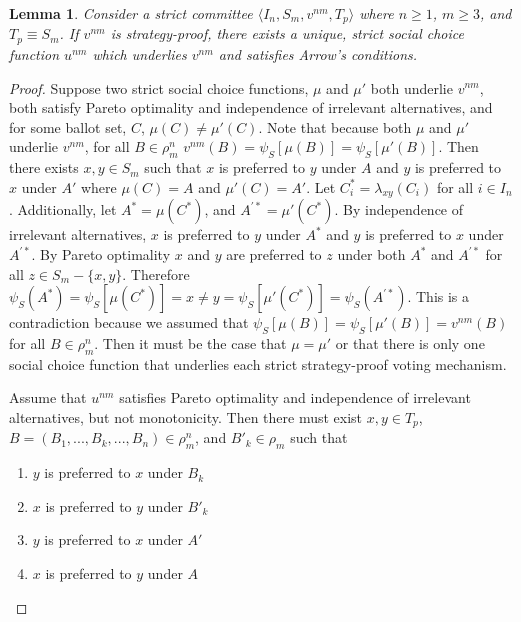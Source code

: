 \documentclass{amsart}
\newtheorem{lemma}{Lemma}
\theoremstyle{plain}
\begin{document}
\begin{lemma}
    Consider a strict committee $\langle I_n, S_m, v^{nm}, T_p \rangle$ where $n \ge 1$, $m \ge 3$, and $T_p \equiv S_m$. If $v^{nm}$ is strategy-proof, there exists a unique, strict social choice function $u^{nm}$ which underlies $v^{nm}$ and satisfies Arrow's conditions.
\end{lemma}

\begin{proof}
    Suppose two strict social choice functions, $\mu$ and $\mu'$ both underlie $v^{nm}$, both satisfy Pareto optimality and independence of irrelevant alternatives, and for some ballot set, $C$, $\mu(C) \ne \mu'(C)$. Note that because both $\mu$ and $\mu'$ underlie $v^{nm}$, for all $B \in \rho_m^n$ $v^{nm}(B) = \psi_S[\mu(B)] = \psi_S[\mu'(B)]$. Then there exists $x,y \in S_m$ such that $x$ is preferred to $y$ under $A$ and $y$ is preferred to $x$ under $A'$ where $\mu(C) = A$ and $\mu'(C) = A'$. Let $C^*_i = \lambda_{xy}(C_i)$ for all $i \in I_n$. Additionally, let $A^* = \mu(C^*)$, and $A^{'*} = \mu'(C^*)$. By independence of irrelevant alternatives, $x$ is preferred to $y$ under $A^*$ and $y$ is preferred to $x$ under $A^{'*}$. By Pareto optimality $x$ and $y$ are preferred to $z$ under both $A^*$ and $A^{'*}$ for all $z \in S_m - \{x,y\}$. Therefore $\psi_S(A^*) = \psi_S[\mu(C^*)] = x \ne y = \psi_S[\mu'(C^*)] = \psi_S(A^{'*})$. This is a contradiction because we assumed that $\psi_S[\mu(B)] = \psi_S[\mu'(B)] = v^{nm}(B)$ for all $B \in \rho_m^n$. Then it must be the case that $\mu = \mu'$ or that there is only one social choice function that underlies each strict strategy-proof voting mechanism.

Assume that $u^{nm}$ satisfies Pareto optimality and independence of irrelevant alternatives, but not monotonicity. Then there must exist $x,y \in T_p$, $B = (B_1, ... , B_k, ... , B_n) \in \rho_m^n$, and $B'_k \in \rho_m$ such that 

\vskip 0.25cm

\begin{enumerate}
    \item $y$ is preferred to $x$ under $B_k$
    \item $x$ is preferred to $y$ under $B'_k$
    \item $y$ is preferred to $x$ under $A'$
    \item $x$ is preferred to $y$ under $A$
\end{enumerate}

\vskip 0.25cm


\end{proof}
\end{document}
